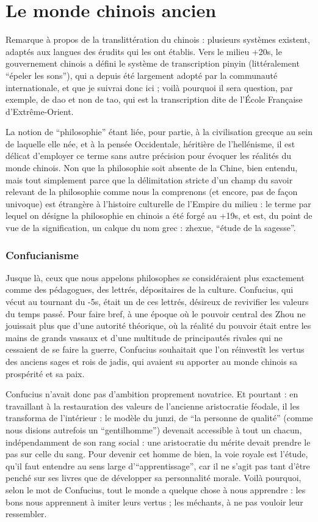 \part{Le monde chinois ancien}

Remarque à propos de la translittération du chinois : plusieurs systèmes existent, adaptés
aux langues des érudits qui les ont établis.
Vers le milieu +20s, le gouvernement
chinois a défini le système de transcription pinyin (littéralement ``épeler les sons''), qui a
depuis été largement adopté par la communauté internationale, et que je suivrai donc ici ;
voilà pourquoi il sera question, par exemple, de dao et non de tao, qui est la transcription
dite de l'École Française d'Extrême-Orient.

La notion de ``philosophie'' étant liée, pour partie, à la civilisation grecque au sein de
laquelle elle née, et à la pensée Occidentale, héritière de l'hellénisme, il est délicat
d'employer ce terme sans autre précision pour évoquer les réalités du monde chinois.
Non
que la philosophie soit absente de la Chine, bien entendu, mais tout simplement parce que
la délimitation stricte d'un champ du savoir relevant de la philosophie comme nous la
comprenons (et encore, pas de façon univoque) est étrangère à l'histoire culturelle de
l'Empire du milieu : le terme par lequel on désigne la philosophie en chinois a été forgé
au +19s, et est, du point de vue de la signification, un calque du nom grec : zhexue,
``étude de la sagesse''.

\section{Confucianisme}
Jusque là, ceux que nous appelons philosophes se considéraient plus exactement comme
des pédagogues, des lettrés, dépositaires de la culture.
Confucius, qui vécut au
tournant du -5s, était un de ces lettrés, désireux de revivifier les
valeurs du temps passé.
Pour faire bref, à une époque où le pouvoir central des Zhou ne
jouissait plus que d'une autorité théorique, où la réalité du pouvoir était entre les mains de
grands vassaux et d'une multitude de principautés rivales qui ne cessaient de se faire la
guerre, Confucius souhaitait que l'on réinvestît les vertus des anciens sages et rois de
jadis, qui avaient su apporter au monde chinois sa prospérité et sa paix.

Confucius n'avait donc pas d'ambition proprement novatrice.
Et pourtant : en travaillant à
la restauration des valeurs de l'ancienne aristocratie féodale, il les transforma de
l'intérieur : le modèle du junzi, de ``la personne de qualité'' (comme nous disions
autrefois un ``gentilhomme'') devenait accessible à tout un chacun, indépendamment de son
rang social : une aristocratie du mérite devait prendre le pas sur celle du sang.
Pour devenir
cet homme de bien, la voie royale est l'étude, qu'il faut entendre au sens large
d'``apprentissage'', car il ne s'agit pas tant d'être penché sur ses livres que de développer
sa personnalité morale.
Voilà pourquoi, selon le mot de Confucius, tout le monde a
quelque chose à nous apprendre : les bons nous apprennent à imiter leurs vertus ; les
méchants, à ne pas vouloir leur ressembler.

